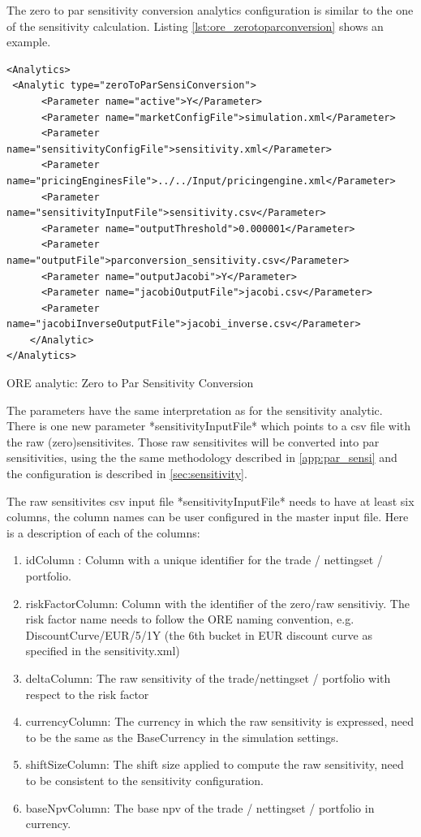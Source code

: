 \documentclass[12pt, a4paper]{article}
\begin{document}
The zero to par sensitivity conversion analytics configuration is similar to the one of the sensitivity calculation. Listing \ref{lst:ore_zerotoparconversion}
shows an example.

\begin{listing}[H]
\begin{verbatim}
<Analytics>
 <Analytic type="zeroToParSensiConversion">
      <Parameter name="active">Y</Parameter>
      <Parameter name="marketConfigFile">simulation.xml</Parameter>
      <Parameter name="sensitivityConfigFile">sensitivity.xml</Parameter>
      <Parameter name="pricingEnginesFile">../../Input/pricingengine.xml</Parameter>
      <Parameter name="sensitivityInputFile">sensitivity.csv</Parameter>
      <Parameter name="outputThreshold">0.000001</Parameter>
      <Parameter name="outputFile">parconversion_sensitivity.csv</Parameter>
      <Parameter name="outputJacobi">Y</Parameter>
      <Parameter name="jacobiOutputFile">jacobi.csv</Parameter>
      <Parameter name="jacobiInverseOutputFile">jacobi_inverse.csv</Parameter>
    </Analytic>
</Analytics>
\end{verbatim}
\caption{ORE analytic: Zero to Par Sensitivity Conversion}
\label{lst:ore_zerotoparconversion}
\end{listing}

The parameters have the same interpretation as for the sensitivity analytic. There is one new parameter *sensitivityInputFile* which points to a csv file with the raw (zero)sensitivites. Those raw sensitivites will be converted into par sensitivities, using the the same methodology described in \ref{app:par_sensi} and the configuration is described in \ref{sec:sensitivity}.

The raw sensitivites csv input file *sensitivityInputFile* needs to have at least six columns, the column names can be user configured in the master input file. Here is a description of each of the columns:

\begin{enumerate}
\item idColumn : Column with a unique identifier for the trade / nettingset / portfolio.
\item riskFactorColumn: Column with the identifier of the zero/raw sensitiviy. The risk factor name needs to follow the ORE naming convention, e.g. DiscountCurve/EUR/5/1Y (the 6th bucket in EUR discount curve as specified in the sensitivity.xml)\
\item deltaColumn: The raw sensitivity of the trade/nettingset / portfolio with respect to the risk factor
\item currencyColumn: The currency in which the raw sensitivity is expressed, need to be the same as the BaseCurrency in the simulation settings.
\item shiftSizeColumn: The shift size applied to compute the raw sensitivity, need to be consistent to the sensitivity configuration.
\item baseNpvColumn: The base npv of the trade / nettingset / portfolio in currency.
\end{enumerate}
\end{document}
